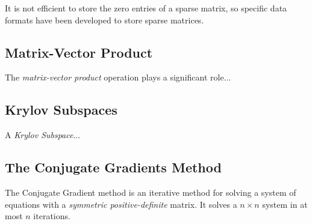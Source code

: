 It is not efficient to store the zero entries of a sparse matrix, so specific data formats have been developed to store sparse matrices.


%
%
\subsection{Matrix-Vector Product}

The \emph{matrix-vector product} operation plays a significant role...


%
%
%
\subsection{Krylov Subspaces}

A \emph{Krylov Subspace}...


%
%
\subsection{The Conjugate Gradients Method}

The Conjugate Gradient method is an iterative method for solving a system of equations with a \emph{symmetric positive-definite} matrix. It solves a $n \times n$ system in at most $n$ iterations.
 












